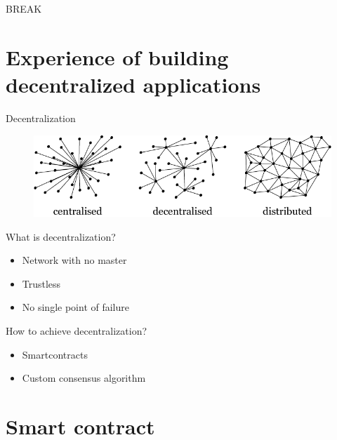 \documentclass[12pt]{beamer}
\begin{document}
  \begin{frame}[standout]
    BREAK
  \end{frame}



  \section{Experience of building decentralized applications}

  \begin{frame}{Decentralization}
    \begin{figure}
      \includegraphics[height=.5\textheight]{images/centralised-decentralised-distributed}
    \end{figure}
  \end{frame}

  \begin{frame}{What is decentralization?}
    \begin{itemize}
      \item Network with \alert{no master}
      \item \alert{Trustless}
      \item No single point of failure
    \end{itemize}
  \end{frame}


  \begin{frame}{How to achieve decentralization?}
    \begin{itemize}
      \item \alert{Smartcontracts}
      \item Custom \alert{consensus} algorithm
    \end{itemize}
  \end{frame}




  \section{Smart contract}
\end{document}

